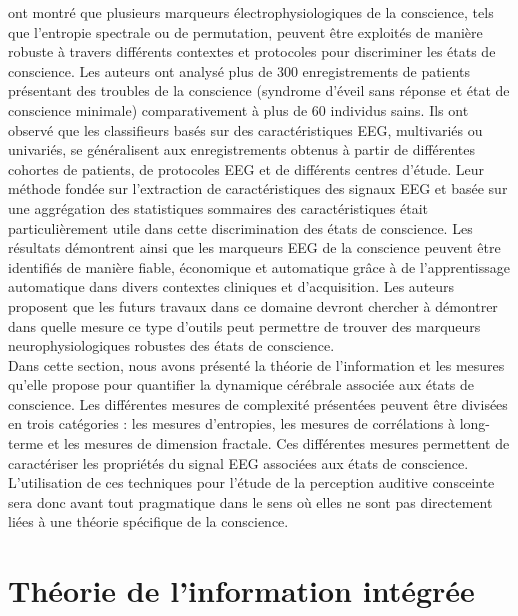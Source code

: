 \cite{engemann2018robust} ont montré que plusieurs marqueurs électrophysiologiques de la conscience, tels que l'entropie spectrale ou de permutation, peuvent être exploités de manière robuste à travers différents contextes et protocoles pour discriminer les états de conscience. 
Les auteurs ont analysé plus de 300 enregistrements de patients présentant des troubles de la conscience (syndrome d'éveil sans réponse et état de conscience minimale) comparativement à plus de 60 individus sains. 
Ils ont observé que les classifieurs basés sur des caractéristiques EEG, multivariés ou univariés, se généralisent aux enregistrements obtenus à partir de différentes cohortes de patients, de protocoles EEG et de différents centres d'étude. 
Leur méthode fondée sur l'extraction de caractéristiques des signaux EEG et basée sur une aggrégation des statistiques sommaires des caractéristiques était particulièrement utile dans cette discrimination des états de conscience. 
Les résultats démontrent ainsi que les marqueurs EEG de la conscience peuvent être identifiés de manière fiable, économique et automatique grâce à de l'apprentissage automatique dans divers contextes cliniques et d'acquisition.
Les auteurs proposent que les futurs travaux dans ce domaine devront chercher à démontrer dans quelle mesure ce type d'outils peut permettre de trouver des marqueurs neurophysiologiques robustes des états de conscience. \\

Dans cette section, nous avons présenté la théorie de l'information et les mesures qu'elle propose pour quantifier la dynamique cérébrale associée aux états de conscience. 
Les différentes mesures de complexité présentées peuvent être divisées en trois catégories : les mesures d'entropies, les mesures de corrélations à long-terme et les mesures de dimension fractale. 
Ces différentes mesures permettent de caractériser les propriétés du signal EEG associées aux états de conscience. 
L'utilisation de ces techniques pour l'étude de la perception auditive consceinte sera donc avant tout pragmatique dans le sens où elles ne sont pas directement liées à une théorie spécifique de la conscience. 

\section{Théorie de l'information intégrée}
\label{theorieinformationintegreepractical}

